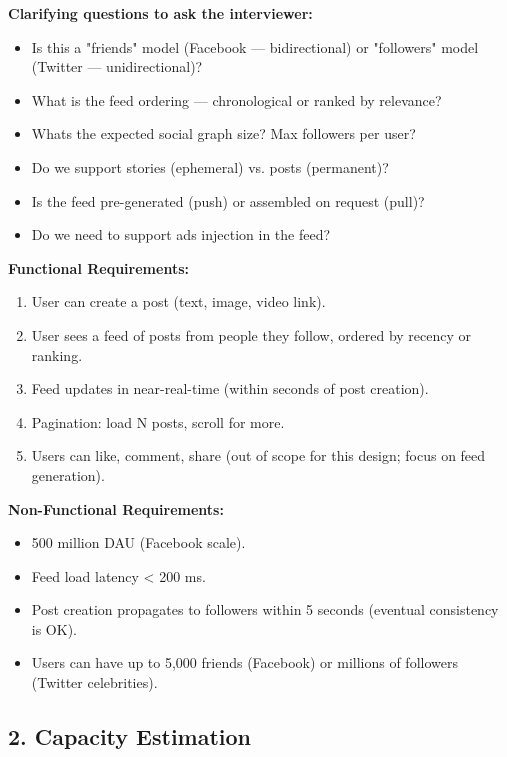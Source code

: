 \documentclass[11pt]{article}
\providecommand{\tightlist}{\setlength{\itemsep}{1pt}\setlength{\parskip}{0pt}}
\begin{document}
\textbf{Clarifying questions to ask the interviewer:}

\begin{itemize}
\tightlist
\item
  Is this a "friends" model (Facebook --- bidirectional) or "followers" model (Twitter --- unidirectional)?
\item
  What is the feed ordering --- chronological or ranked by relevance?
\item
  What\textquotesingle s the expected social graph size? Max followers per user?
\item
  Do we support stories (ephemeral) vs. posts (permanent)?
\item
  Is the feed pre-generated (push) or assembled on request (pull)?
\item
  Do we need to support ads injection in the feed?
\end{itemize}

\textbf{Functional Requirements:}

\begin{enumerate}
\def\labelenumi{\arabic{enumi}.}
\tightlist
\item
  User can create a post (text, image, video link).
\item
  User sees a feed of posts from people they follow, ordered by recency or ranking.
\item
  Feed updates in near-real-time (within seconds of post creation).
\item
  Pagination: load N posts, scroll for more.
\item
  Users can like, comment, share (out of scope for this design; focus on feed generation).
\end{enumerate}

\textbf{Non-Functional Requirements:}

\begin{itemize}
\tightlist
\item
  500 million DAU (Facebook scale).
\item
  Feed load latency \textless{} 200 ms.
\item
  Post creation propagates to followers within 5 seconds (eventual consistency is OK).
\item
  Users can have up to 5,000 friends (Facebook) or millions of followers (Twitter celebrities).
\end{itemize}

\subsection{2. Capacity Estimation}\label{2-capacity-estimation-2}
\end{document}
